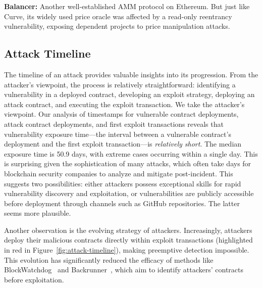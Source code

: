 \textbf{Balancer:} Another well-established AMM protocol on Ethereum. But just like Curve, its widely used price oracle was affected by a read-only reentrancy vulnerability, exposing dependent projects to price manipulation attacks.



\subsection{Attack Timeline}
\label{quantitative:attack-timeline}

The timeline of an attack provides valuable insights into its progression. %
From the attacker's viewpoint, the process is relatively straightforward: identifying a vulnerability in a deployed contract, developing an exploit strategy, deploying an attack contract, and executing the exploit transaction. We take the attacker's viewpoint.  
Our analysis of timestamps for vulnerable contract deployments, attack contract deployments, and first exploit transactions reveals that vulnerability exposure time—the interval between a vulnerable contract's deployment and the first exploit transaction—is \emph{relatively short}. The median exposure time is 50.9 days, with extreme cases occurring within a single day. This is surprising given the sophistication of many attacks, which often take days for blockchain security companies to analyze and mitigate post-incident. This suggests two possibilities: either attackers possess exceptional skills for rapid vulnerability discovery and exploitation, or vulnerabilities are publicly accessible before deployment through channels such as GitHub repositories. The latter seems more plausible.

Another observation is the evolving strategy of attackers. Increasingly, attackers deploy their malicious contracts directly within exploit transactions (highlighted in red in Figure~\ref{fig:attack-timeline}), making preemptive detection impossible. This evolution has significantly reduced the efficacy of methods like BlockWatchdog~\cite{attack-contract-detection} and Backrunner~\cite{backrunner}, which aim to identify attackers' contracts before exploitation.

